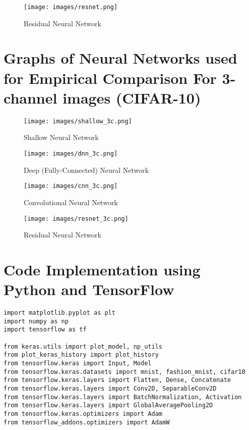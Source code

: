 \documentclass{article} %
\begin{document}
\begin{figure}[h]
\begin{center}
\texttt{[image: images/resnet.png]}
\end{center}
\caption{Residual Neural Network}
\end{figure}

\clearpage
\section{Graphs of Neural Networks used for Empirical Comparison For 3-channel images (CIFAR-10)}

\begin{figure}[h]
\begin{center}
\texttt{[image: images/shallow\_3c.png]}
\end{center}
\caption{Shallow Neural Network}
\end{figure}

\begin{figure}[h]
\begin{center}
\texttt{[image: images/dnn\_3c.png]}
\end{center}
\caption{Deep (Fully-Connected) Neural Network}
\end{figure}

\begin{figure}[h]
\begin{center}
\texttt{[image: images/cnn\_3c.png]}
\end{center}
\caption{Convolutional Neural Network}
\end{figure}

\begin{figure}[h]
\begin{center}
\texttt{[image: images/resnet\_3c.png]}
\end{center}
\caption{Residual Neural Network}
\end{figure}

\clearpage
\section{Code Implementation using Python and TensorFlow}
\lstset{language=Python}
\lstset{frame=lines}
\lstset{basicstyle=\footnotesize}
\begin{lstlisting}
import matplotlib.pyplot as plt
import numpy as np
import tensorflow as tf

from keras.utils import plot_model, np_utils
from plot_keras_history import plot_history
from tensorflow.keras import Input, Model
from tensorflow.keras.datasets import mnist, fashion_mnist, cifar10
from tensorflow.keras.layers import Flatten, Dense, Concatenate
from tensorflow.keras.layers import Conv2D, SeparableConv2D
from tensorflow.keras.layers import BatchNormalization, Activation
from tensorflow.keras.layers import GlobalAveragePooling2D
from tensorflow.keras.optimizers import Adam
from tensorflow_addons.optimizers import AdamW
\end{lstlisting}
\end{document}
